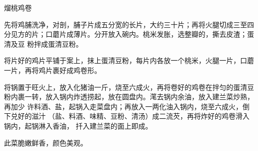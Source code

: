 %
%
%
%
%
%
%
\begin{recipe}{熘桃鸡卷}

\ingredients


\preparation

\step 先将鸡脯洗净，对剖，脯子片成五分宽的长片，大约三十片；再将火腿切成三至四
分见方的片；口蘑片成薄片。分开放入碗内。桃米发胀，选整瓣的，撕去皮渣；蛋清及豆
粉拌成蛋清豆粉。

\step 将片好的鸡片平铺于案上，抹上蛋清豆粉，每片内各放一个桃米，火腿一片，口蘑
一片，再将鸡片裹好成鸡卷形。

\step 将锅置于旺火上，放入化猪油一斤，烧至六成火，再将卷好的鸡卷在拌匀的蛋清豆
粉内裹一转，放入锅内炸透捞起，放在圆盘内。滗去锅内余油，放入建兰菜炒熟，再加少
许料酒、盐，起锅入走菜盘内；再放入一两化油入锅内，烧至六成火，倒下兑好的滋汁
（盐、料酒、味精、豆粉、清汤）成二流芡，再将炸好的鸡卷滑入锅内，起锅淋入香油，
扦入建兰菜的面上即成。

\features

此菜脆嫩鲜香，颜色美观。

\end{recipe}

